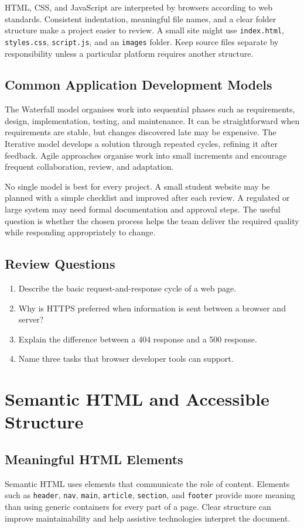 \documentclass[11pt,openany,oneside]{book}
\begin{document}
HTML, CSS, and JavaScript are interpreted by browsers according to web standards. Consistent indentation, meaningful file names, and a clear folder structure make a project easier to review. A small site might use \texttt{index.html}, \texttt{styles.css}, \texttt{script.js}, and an \texttt{images} folder. Keep source files separate by responsibility unless a particular platform requires another structure.

\section{Common Application Development Models}
The Waterfall model organises work into sequential phases such as requirements, design, implementation, testing, and maintenance. It can be straightforward when requirements are stable, but changes discovered late may be expensive. The Iterative model develops a solution through repeated cycles, refining it after feedback. Agile approaches organise work into small increments and encourage frequent collaboration, review, and adaptation.

No single model is best for every project. A small student website may be planned with a simple checklist and improved after each review. A regulated or large system may need formal documentation and approval steps. The useful question is whether the chosen process helps the team deliver the required quality while responding appropriately to change.

\section*{Review Questions}
\begin{enumerate}
\item Describe the basic request-and-response cycle of a web page.
\item Why is HTTPS preferred when information is sent between a browser and server?
\item Explain the difference between a 404 response and a 500 response.
\item Name three tasks that browser developer tools can support.
\end{enumerate}

\chapter{Semantic HTML and Accessible Structure}
\section{Meaningful HTML Elements}
Semantic HTML uses elements that communicate the role of content. Elements such as \texttt{header}, \texttt{nav}, \texttt{main}, \texttt{article}, \texttt{section}, and \texttt{footer} provide more meaning than using generic containers for every part of a page. Clear structure can improve maintainability and help assistive technologies interpret the document.
\end{document}
